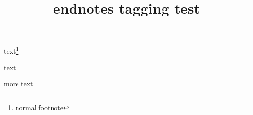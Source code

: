 \documentclass{article}
\title{endnotes tagging test}
\begin{document}
text\footnote{normal footnote}

text

more text

\theendnotes
\end{document}
